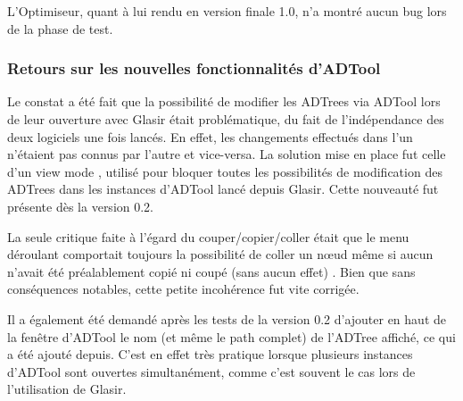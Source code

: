 L'Optimiseur, quant à lui rendu en version finale 1.0, n'a montré aucun bug lors de la phase de test.

\subsubsection{Retours sur les nouvelles fonctionnalités d'ADTool}
\label{subsubsec:ADTool}


Le constat a été fait que la possibilité de modifier les ADTrees via ADTool lors de leur ouverture avec Glasir était problématique, du fait de l'indépendance des deux logiciels une fois lancés. En effet, les changements effectués dans l'un n'étaient pas connus par l'autre et vice-versa. La solution mise en place fut celle d'un \og view mode \fg{}, utilisé pour bloquer toutes les possibilités de modification des ADTrees dans les instances d'ADTool lancé depuis Glasir. Cette nouveauté fut présente dès la version 0.2.

La seule critique faite à l'égard du couper/copier/coller était que le menu déroulant comportait toujours la possibilité de coller  un n\oe{}ud même si aucun n'avait été préalablement copié ni coupé (sans aucun effet) . Bien que sans conséquences notables, cette petite incohérence fut vite corrigée. 

Il a également été demandé après les tests de la version 0.2 d'ajouter en haut de la fenêtre d'ADTool le nom (et même le path complet) de l'ADTree affiché, ce qui a été  ajouté depuis. C'est en effet très pratique lorsque plusieurs instances d'ADTool sont ouvertes simultanément, comme c'est souvent le cas lors de l'utilisation de Glasir. 





